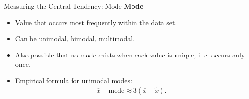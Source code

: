 \begin{frame}{Measuring the Central Tendency: Mode}
	\textbf{Mode}
	\begin{itemize}
		\item Value that occurs most frequently within the data set.
		\item Can be unimodal, bimodal, multimodal.
		\item Also possible that no mode exists when each value is unique,
		      i. e. occurs only once.
		\item Empirical formula for unimodal modes:
		      \begin{align*}
			      \overline{x} - \text{mode} \approx 3(\overline{x}- \tilde{x}).
		      \end{align*}
	\end{itemize}
\end{frame}


